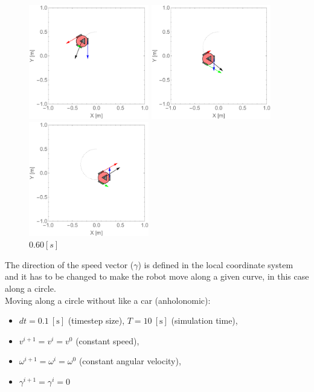 \documentclass[12pt,english]{article}
\begin{document}
\begin{figure}[htb!]
	\centering
	\includegraphics[height=5cm]{figures/2d_simulation/animations/2D_move_along_circle_not_rotating/20}
	\caption{$0.20[s]$}
	\endminipage\hfill
	\centering
	\includegraphics[height=5cm]{figures/2d_simulation/animations/2D_move_along_circle_not_rotating/40}
	\caption{$0.40[s]$}
	\endminipage\hfill
	\centering
	\includegraphics[height=5cm]{figures/2d_simulation/animations/2D_move_along_circle_not_rotating/60}
	\caption{$0.60[s]$}
	\endminipage\hfill
\end{figure}
The direction of the speed vector ($\gamma$) is defined in the local coordinate system and it has to be changed to make the robot move along a given curve, in this case along a circle.\\[0.3cm]
\noindent Moving along a circle without like a car (anholonomic):
\begin{itemize}
	\item $dt=0.1~[\text{s}]$ (timestep size), $T=10~[\text{s}]$ (simulation time),
	\item $v^{i+1} = v^{i} = v^{0}$ (constant speed),
	\item $\omega^{i+1} = \omega^{i} = \omega^{0}$ (constant angular velocity),
	\item $\gamma^{i+1} = \gamma^i = 0$
\end{itemize}
\end{document}
